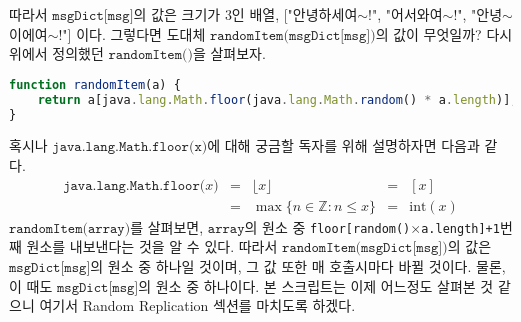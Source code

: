 \documentclass[10pt,a4paper,final]{book}
\begin{document}
따라서 $\texttt{msgDict[msg]}$의 값은 크기가 3인 배열, ["안녕하세여$\sim$!", "어서와여$\sim$!", "안녕$\sim$ 이에여$\sim$!"]
이다.
그렇다면 도대체 $\texttt{randomItem(msgDict[msg])}$의 값이 무엇일까? 다시 위에서 정의했던 $\texttt{randomItem()}$을 살펴보자.
\begin{lstlisting}[language=JavaScript,escapeinside=~~, caption={$\texttt{randomItem(array)}$}]
function randomItem(a) {
    return a[java.lang.Math.floor(java.lang.Math.random() * a.length)];
}
\end{lstlisting}
혹시나 $\texttt{java.lang.Math.floor(x)}$에 대해 궁금할 독자를 위해 설명하자면 다음과 같다.
\[
\begin{matrix}
\texttt{java.lang.Math.floor(}x\texttt{)} &=& \lfloor x\rfloor &=& [x]\\
       &=& \max\{n\in \mathbb {Z} \colon n\leq x\} &=& \text{int}(x)
\end{matrix}
\]
$\texttt{randomItem(array)}$를 살펴보면, $\texttt{array}$의 원소 중 \texttt{floor[random()$\times$a.length]+1}번째 원소를
내보낸다는 것을 알 수 있다. 따라서 $\texttt{randomItem(msgDict[msg])}$의 값은 $\texttt{msgDict[msg]}$의 원소 중
하나일 것이며, 그 값 또한 매 호출시마다 바뀔 것이다. 물론, 이 때도 $\texttt{msgDict[msg]}$의 원소 중 하나이다. 본 스크립트는 이제
어느정도 살펴본 것 같으니 여기서 Random Replication 섹션를 마치도록 하겠다.
\end{document}
